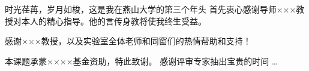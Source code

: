 \makeatletter
{}
  \pagestyle{fancy}%
  \fancyhf{}
\makeatother

\begin{thanks}
时光荏苒，岁月如梭，这是我在燕山大学的第三个年头
首先衷心感谢导师×××教授对本人的精心指导。他的言传身教将使我终生受益。

感谢×××教授，以及实验室全体老师和同窗们的热情帮助和支持！

本课题承蒙××××基金资助，特此致谢。
感谢评审专家抽出宝贵的时间
…

\end{thanks}

